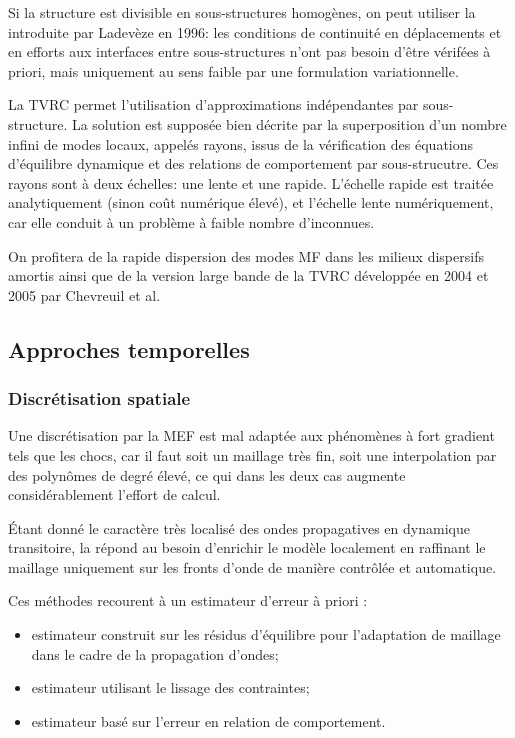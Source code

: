 Si la structure est divisible en sous-structures homogènes, on peut utiliser la  introduite 
par Ladevèze en 1996: 
les conditions de continuité en déplacements et en efforts aux interfaces entre 
sous-structures n'ont pas besoin d'être vérifées à priori, mais uniquement au sens faible par une 
formulation variationnelle.

La TVRC permet l'utilisation d'approximations indépendantes par sous-structure.
La solution est supposée bien décrite par la superposition d'un nombre infini de modes
locaux, appelés rayons, issus de la vérification des équations d'équilibre dynamique
et des relations de comportement par sous-strucutre.
Ces rayons sont à deux échelles: une lente et une rapide.
L'échelle rapide est traitée analytiquement (sinon coût numérique élevé), et l'échelle
lente numériquement, car elle conduit à un problème à faible nombre d'inconnues.

On profitera de la rapide dispersion des modes MF dans les milieux dispersifs amortis
ainsi que de la version large bande de la TVRC développée en 2004 et 2005 par 
Chevreuil et al.

\medskip
\subsection{Approches temporelles}

\subsubsection{Discrétisation spatiale}
Une discrétisation par la MEF est mal adaptée aux phénomènes à fort gradient tels
que les chocs, car il faut soit un maillage très fin, soit une interpolation par des polynômes
de degré élevé, ce qui dans les deux cas augmente considérablement l'effort de calcul.

Étant donné le caractère très localisé des ondes propagatives en dynamique transitoire,
la  répond au besoin d'enrichir le modèle 
localement en raffinant le maillage uniquement sur les fronts d'onde de manière contrôlée et
automatique.

Ces méthodes recourent à un estimateur d'erreur à priori :
\begin{itemize}
	\item estimateur construit sur les résidus d'équilibre pour l'adaptation de
		maillage dans le cadre de la propagation d'ondes;
	\item estimateur utilisant le lissage des contraintes;
	\item estimateur basé sur l'erreur en relation de comportement.
\end{itemize}

